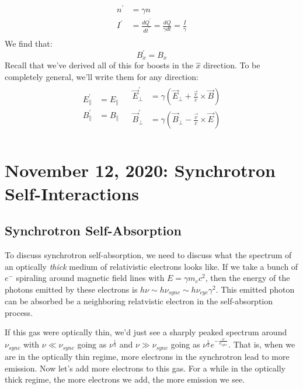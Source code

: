 \documentclass{article}
\def\hf{\frac12}
\def\ef{\vec E}
\def\ef{\vec E}
\def\bfield{{\vec B}}
\def\hf{\frac12}
\def\^{\hat }
\begin{document}
$$\begin{aligned}n^\prime&=\gamma n\\ 
I^\prime&=\frac{dQ^\prime}{ dt^\prime}=\frac{dQ}{\gamma dt}=\frac{I}{\gamma}\\ \end{aligned}$$
We find that:
$$\boxed{B_x^\prime=B_x}$$
Recall that we've derived all of this for boosts in the $\^x$ direction.
To be completely general, we'll write them for any direction:
$$\begin{matrix}\begin{aligned}E_\|^\prime&=E_\|\\ 
B_\|^\prime&=B_\|\\ \end{aligned}&
\begin{aligned}\vec E_\perp^\prime
&=\gamma(\ef_\perp+\frac{\vec v}{ c}\times\bfield)\\ 
\vec B_\perp^\prime&=\gamma(\bfield_\perp-\frac{\vec v}{ c}\times\ef)\\ 
\end{aligned}
\end{matrix}$$


\newpage
\section{November 12, 2020: Synchrotron Self-Interactions}

\subsection{ Synchrotron Self-Absorption}

To discuss synchrotron self-absorption, we need to discuss what the spectrum
of an optically {\it thick} medium of relativistic electrons looks like.
If we take a bunch of $e^-$ spiraling around magnetic field lines with
$E=\gamma m_ec^2$, then the energy of the photons emitted by these
electrons is $h\nu\sim h\nu_{sync}\sim h\nu_{cyc}\gamma^2$. This emitted photon can be absorbed be a neighboring relatvistic electron in the self-absorption process.

If this gas
were optically thin, we'd just see a sharply peaked spectrum around $\nu_{sync}$
with $\nu\ll\nu_{sync}$ going as $\nu^\frac{1}{3}$ and $\nu\gg\nu_{sync}$ going
as $\nu^\hf e^{-\frac{\nu}{\nu_{sync}}}$. That is, when we are in the optically thin regime, more electrons in the synchrotron lead to more emission. Now let's add more electrons to this
gas.  For a while in the optically thick regime, the more electrons we add, the more emission we see.
\end{document}

